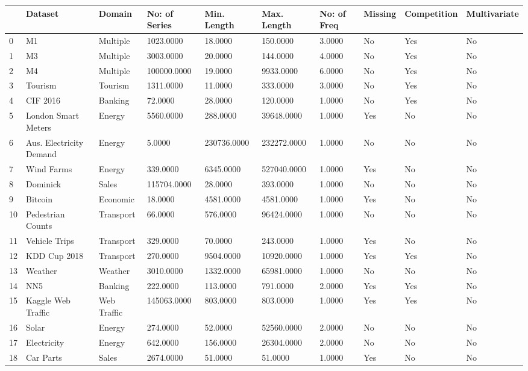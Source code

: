 \begin{tabular}{llllllllll}
\toprule
 & Dataset & Domain & No: of Series & Min. Length & Max. Length & No: of Freq & Missing & Competition & Multivariate \\
\midrule
0 & M1 & Multiple & 1023.0000 & 18.0000 & 150.0000 & 3.0000 & No & Yes & No \\
1 & M3 & Multiple & 3003.0000 & 20.0000 & 144.0000 & 4.0000 & No & Yes & No \\
2 & M4 & Multiple & 100000.0000 & 19.0000 & 9933.0000 & 6.0000 & No & Yes & No \\
3 & Tourism & Tourism & 1311.0000 & 11.0000 & 333.0000 & 3.0000 & No & Yes & No \\
4 & CIF 2016 & Banking & 72.0000 & 28.0000 & 120.0000 & 1.0000 & No & Yes & No \\
5 & London Smart Meters & Energy & 5560.0000 & 288.0000 & 39648.0000 & 1.0000 & Yes & No & No \\
6 & Aus. Electricity Demand & Energy & 5.0000 & 230736.0000 & 232272.0000 & 1.0000 & No & No & No \\
7 & Wind Farms & Energy & 339.0000 & 6345.0000 & 527040.0000 & 1.0000 & Yes & No & No \\
8 & Dominick & Sales & 115704.0000 & 28.0000 & 393.0000 & 1.0000 & No & No & No \\
9 & Bitcoin & Economic & 18.0000 & 4581.0000 & 4581.0000 & 1.0000 & Yes & No & No \\
10 & Pedestrian Counts & Transport & 66.0000 & 576.0000 & 96424.0000 & 1.0000 & No & No & No \\
11 & Vehicle Trips & Transport & 329.0000 & 70.0000 & 243.0000 & 1.0000 & Yes & No & No \\
12 & KDD Cup 2018 & Transport & 270.0000 & 9504.0000 & 10920.0000 & 1.0000 & Yes & Yes & No \\
13 & Weather & Weather & 3010.0000 & 1332.0000 & 65981.0000 & 1.0000 & No & No & No \\
14 & NN5 & Banking & 222.0000 & 113.0000 & 791.0000 & 2.0000 & Yes & Yes & No \\
15 & Kaggle Web Traffic & Web Traffic & 145063.0000 & 803.0000 & 803.0000 & 1.0000 & Yes & Yes & No \\
16 & Solar & Energy & 274.0000 & 52.0000 & 52560.0000 & 2.0000 & No & No & No \\
17 & Electricity & Energy & 642.0000 & 156.0000 & 26304.0000 & 2.0000 & No & No & No \\
18 & Car Parts & Sales & 2674.0000 & 51.0000 & 51.0000 & 1.0000 & Yes & No & No \\

\end{tabular}
